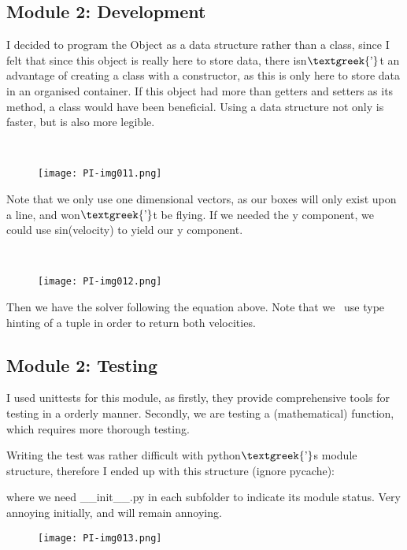\documentclass{article}
\begin{document}
\subsection{Module 2: Development}

\bigskip

I decided to program the Object as a data structure rather than a class, since I felt that since this object is really
here to store data, there isn$\text{\textgreek{’}}$t an advantage of creating a class with a constructor, as this is
only here to store data in an organised container. If this object had more than getters and setters as its method, a
class would have been beneficial. Using a data structure not only is faster, but is also more legible.

\ 

\begin{figure}
\texttt{[image: PI-img011.png]}\end{figure}
Note that we only use one dimensional vectors, as our boxes will only exist upon a line, and won$\text{\textgreek{’}}$t
be flying. If we needed the y component, we could use sin(velocity) to yield our y component.


\bigskip


\bigskip

\ 

\begin{figure}
\texttt{[image: PI-img012.png]}\end{figure}
Then we have the solver following the equation above. Note that we \ use type hinting of a tuple in order to return both
velocities.


\bigskip

\subsection{Module 2: Testing}
I used unittests for this module, as firstly, they provide comprehensive tools for testing in a orderly manner.
Secondly, we are testing a (mathematical) function, which requires more thorough testing.

Writing the test was rather difficult with python$\text{\textgreek{’}}$s module structure, therefore I ended up with
this structure (ignore pycache):

where we need \_\_init\_\_.py in each subfolder to indicate its module status. Very annoying initially, and will remain
annoying.

\begin{figure}
\texttt{[image: PI-img013.png]}\end{figure}
\end{document}
